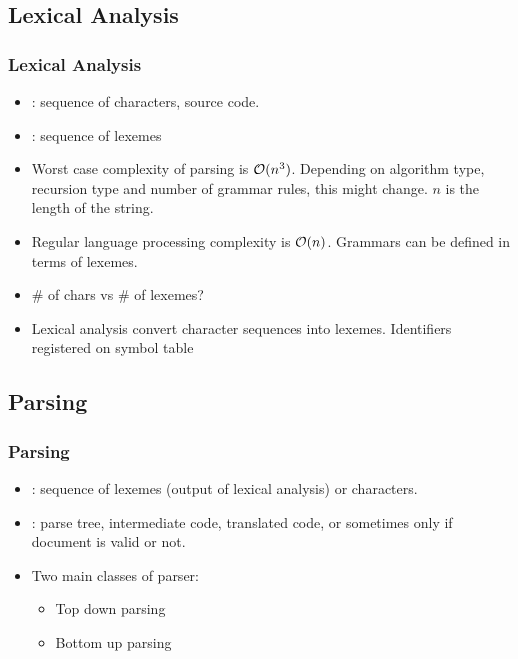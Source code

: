 \subsection{Lexical Analysis}
\begin{frame}
\frametitle{Lexical Analysis}
\begin{itemize}
\item {}: sequence of characters, source code.
\item {}: sequence of lexemes
\item Worst case complexity of parsing is ${\cal O}(n^3)$.
	Depending on algorithm type, recursion type and number of
	grammar rules, this might change. $n$ is the length of the string.
\item Regular language processing complexity is ${\cal O}(n)$. Grammars can be 
	defined in terms of lexemes.
\item \# of chars vs \# of lexemes? 
\item Lexical analysis convert character sequences into lexemes. Identifiers
	registered on symbol table
\end{itemize}
\end{frame}

\subsection{Parsing}
\begin{frame}
\frametitle{Parsing}
\begin{itemize}
\item {}: sequence of lexemes (output of lexical analysis) or characters.
\item {}: parse tree, intermediate code, translated code, or sometimes only if document is valid or not.
\item Two main classes of parser:
	\begin{itemize}
	\item Top down parsing
	\item Bottom up parsing
	\end{itemize}
\end{itemize}
\end{frame}

